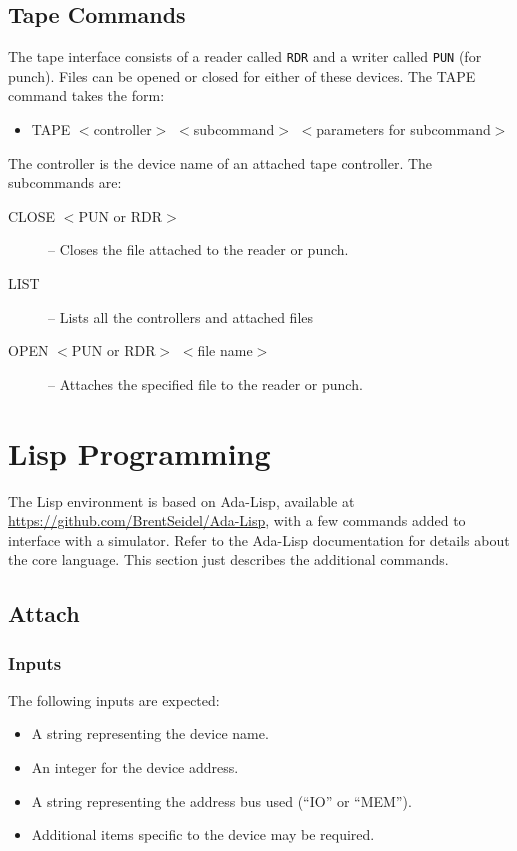 \documentclass[10pt, openany]{book}
\begin{document}
\subsection{Tape Commands}
The tape interface consists of a reader called \verb|RDR| and a writer called \verb|PUN| (for punch).  Files can be opened or closed for either of these devices.   The TAPE command takes the form:
\begin{itemize}
  \item TAPE $<$controller$>$ $<$subcommand$>$ $<$parameters for subcommand$>$
\end{itemize}
The controller is the device name of an attached tape controller.  The subcommands are:
\begin{description}
  \item[CLOSE $<$PUN or RDR$>$]  -- Closes the file attached to the reader or punch.
  \item[LIST] --  Lists all the controllers and attached files
  \item[OPEN $<$PUN or RDR$>$ $<$file name$>$] --  Attaches the specified file to the reader or punch.
\end{description}


\section{Lisp Programming}
The Lisp environment is based on Ada-Lisp, available at \url{https://github.com/BrentSeidel/Ada-Lisp}, with a few commands added to interface with a simulator.  Refer to the Ada-Lisp documentation for details about the core language.  This section just describes the additional commands.

\subsection{Attach}
\subsubsection{Inputs}
The following inputs are expected:
\begin{itemize}
  \item A string representing the device name.
  \item An integer for the device address.
  \item A string representing the address bus used (``IO'' or ``MEM'').
  \item Additional items specific to the device may be required.
\end{itemize}
\end{document}
